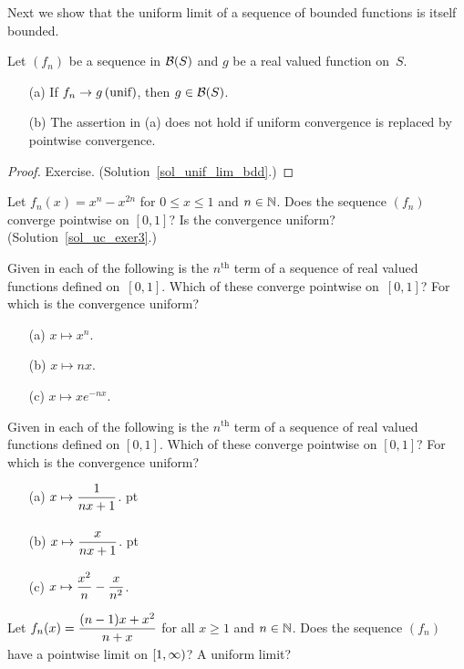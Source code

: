 Next we show that the uniform limit of a sequence of bounded functions is itself bounded.

\begin{prop}\label{unif_lim_bdd} Let $(f_n)$ be a sequence in $\mathcal{B}(S)$ and $g$ be a
real valued function on~$S$.
 \begin{enumerate}
  \item[(a)] If $f_n \rightarrow g \text{\,(unif)}$, then $g \in \mathcal{B}(S)$.
  \item[(b)] The assertion in (a) does not hold if uniform convergence is replaced by
pointwise convergence.
 \end{enumerate}
\end{prop}

\begin{proof} Exercise.  (Solution~\ref{sol_unif_lim_bdd}.) \ns \end{proof}

\begin{exer}\label{uc_exer3} Let $f_n(x) = x^n - x^{2n}$ for $0 \le x \le 1$ and $n \in \mathbb{N}$.
Does the sequence $(f_n)$ converge pointwise on $[0,1]$? Is the convergence uniform?
(Solution~\ref{sol_uc_exer3}.)
\end{exer}

\begin{prob} Given in each of the following is the $n^{\text{th}}$ term of a sequence of
real valued functions defined on~$[0,1]$. Which of these converge pointwise on~$[0,1]$?  For
which is the convergence uniform?
 \begin{enumerate}
  \item[(a)] $x \mapsto x^n$.
  \item[(b)] $x \mapsto nx$.
  \item[(c)] $x \mapsto xe^{-nx}$.
 \end{enumerate}
\end{prob}

\begin{prob} Given in each of the following is the $n^{\text{th}}$ term of a sequence of real
valued functions defined on $[0,1]$.  Which of these converge pointwise on $[0,1]$? For which
is the convergence uniform?
 \begin{enumerate}
  \item[(a)] $x \mapsto \dfrac1{\mathstrut nx+1}$.
 pt
  \item[(b)] $x \mapsto \dfrac{\mathstrut x}{\mathstrut nx+1}$.
 pt
  \item[(c)] $x \mapsto \dfrac{\mathstrut x^2}n - \dfrac{\mathstrut x}{n^2}$.
 \end{enumerate}
\end{prob}

\begin{prob} Let $f_n(x) = \dfrac{(n-1)x + x^2}{\mathstrut n + x}$ for all $x \ge 1$ and
$n \in \mathbb{N}$. Does the sequence $(f_n)$ have a pointwise limit on $\mathstrut [1,\infty)$?  A
uniform limit?
\end{prob}
